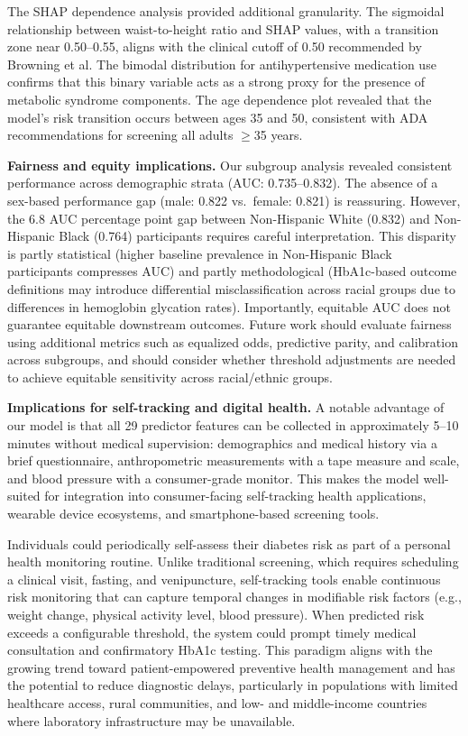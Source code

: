 \documentclass{amia}
\begin{document}
The SHAP dependence analysis provided additional granularity. The sigmoidal relationship between waist-to-height ratio and SHAP values, with a transition zone near 0.50--0.55, aligns with the clinical cutoff of 0.50 recommended by Browning et al.\cite{browning2010} The bimodal distribution for antihypertensive medication use confirms that this binary variable acts as a strong proxy for the presence of metabolic syndrome components. The age dependence plot revealed that the model's risk transition occurs between ages 35 and 50, consistent with ADA recommendations for screening all adults $\geq$35 years.\cite{apa2024}

\textbf{Fairness and equity implications.} Our subgroup analysis revealed consistent performance across demographic strata (AUC: 0.735--0.832). The absence of a sex-based performance gap (male: 0.822 vs.\ female: 0.821) is reassuring. However, the 6.8 AUC percentage point gap between Non-Hispanic White (0.832) and Non-Hispanic Black (0.764) participants requires careful interpretation. This disparity is partly statistical (higher baseline prevalence in Non-Hispanic Black participants compresses AUC) and partly methodological (HbA1c-based outcome definitions may introduce differential misclassification across racial groups due to differences in hemoglobin glycation rates).\cite{apa2024} Importantly, equitable AUC does not guarantee equitable downstream outcomes.\cite{obermeyer2019} Future work should evaluate fairness using additional metrics such as equalized odds, predictive parity, and calibration across subgroups, and should consider whether threshold adjustments are needed to achieve equitable sensitivity across racial/ethnic groups.

\textbf{Implications for self-tracking and digital health.} A notable advantage of our model is that all 29 predictor features can be collected in approximately 5--10 minutes without medical supervision: demographics and medical history via a brief questionnaire, anthropometric measurements with a tape measure and scale, and blood pressure with a consumer-grade monitor. This makes the model well-suited for integration into consumer-facing self-tracking health applications, wearable device ecosystems, and smartphone-based screening tools.

Individuals could periodically self-assess their diabetes risk as part of a personal health monitoring routine. Unlike traditional screening, which requires scheduling a clinical visit, fasting, and venipuncture, self-tracking tools enable continuous risk monitoring that can capture temporal changes in modifiable risk factors (e.g., weight change, physical activity level, blood pressure). When predicted risk exceeds a configurable threshold, the system could prompt timely medical consultation and confirmatory HbA1c testing. This paradigm aligns with the growing trend toward patient-empowered preventive health management and has the potential to reduce diagnostic delays, particularly in populations with limited healthcare access, rural communities, and low- and middle-income countries where laboratory infrastructure may be unavailable.
\end{document}
